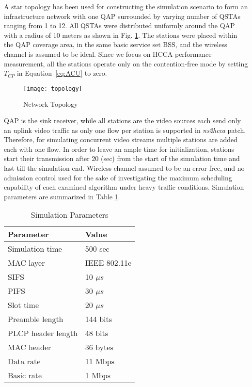 \documentclass[a4paper, conference]{IEEEtran}
\begin{document}
A star topology has been used for constructing the simulation scenario to form an infrastructure network with one QAP surrounded by varying number of QSTAs ranging from 1 to 12. All QSTAs were distributed uniformly around the QAP with a radius of 10 meters as shown in Fig. \ref{fig:topology}. The stations were placed within the QAP coverage area, in the same basic service set BSS, and the wireless channel is assumed to be ideal. Since we focus on HCCA performance measurement, all the stations operate only on the contention-free mode by setting $T_{CP}$ in Equation~\eqref{eq:ACU} to zero.
\begin{figure}[hbtp]
\centering
\texttt{[image: topology]}
\caption{Network Topology}
\label{fig:topology}
\end{figure}
QAP is the sink receiver, while all stations are the video sources each send only an uplink video traffic as only one flow per station is supported in \textit{ns2hcca} patch. Therefore, for simulating concurrent video streams multiple stations are added each with one flow. In order to leave an ample time for initialization, stations start their transmission after 20 (sec) from the start of the simulation time and last till the simulation end. Wireless channel assumed to be an error-free, and no admission control used for the sake of investigating the maximum scheduling capability of each examined algorithm under heavy traffic conditions. Simulation parameters are summarized in Table \ref{tab:SimPars}.
\begin{table}
    \caption {Simulation Parameters}
    \centering
    \begin{tabular}[width=\linewidt]{p{6cm}p{2.2cm}}
    \hline
    Parameter			& Value			\\ \hline
    Simulation time		& 500 sec		\\
MAC layer			& IEEE 802.11e	\\
    SIFS				& 10 $\mu s$	\\
    PIFS				& 30 $\mu s$	\\
    Slot time			& 20 $\mu s$	\\
    Preamble length		& 144 bits		\\
    PLCP header length	& 48 bits		\\
MAC header			& 36 bytes		\\
    Data rate			& 11 Mbps		\\
    Basic rate			& 1 Mbps		\\ \hline
    \end{tabular}
    \label{tab:SimPars}
\end{table}
\end{document}
